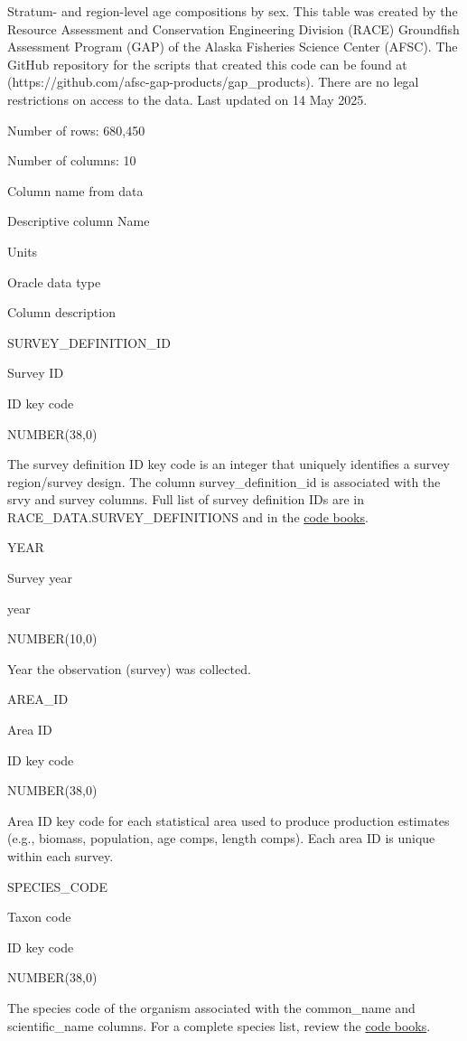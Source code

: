 \documentclass[
  letterpaper,
  oneside,
  open=any]{scrbook}
\begin{document}
Stratum- and region-level age compositions by sex. This table was
created by the Resource Assessment and Conservation Engineering Division
(RACE) Groundfish Assessment Program (GAP) of the Alaska Fisheries
Science Center (AFSC). The GitHub repository for the scripts that
created this code can be found at
(https://github.com/afsc-gap-products/gap\_products). There are no legal
restrictions on access to the data. Last updated on 14 May 2025.

Number of rows: 680,450

Number of columns: 10

Column name from data

Descriptive column Name

Units

Oracle data type

Column description

SURVEY\_DEFINITION\_ID

Survey ID

ID key code

NUMBER(38,0)

The survey definition ID key code is an integer that uniquely identifies
a survey region/survey design. The column survey\_definition\_id is
associated with the srvy and survey columns. Full list of survey
definition IDs are in RACE\_DATA.SURVEY\_DEFINITIONS and in the
\href{https://www.fisheries.noaa.gov/resource/document/groundfish-survey-species-code-manual-and-data-codes-manual}{code
books}.

YEAR

Survey year

year

NUMBER(10,0)

Year the observation (survey) was collected.

AREA\_ID

Area ID

ID key code

NUMBER(38,0)

Area ID key code for each statistical area used to produce production
estimates (e.g., biomass, population, age comps, length comps). Each
area ID is unique within each survey.

SPECIES\_CODE

Taxon code

ID key code

NUMBER(38,0)

The species code of the organism associated with the common\_name and
scientific\_name columns. For a complete species list, review the
\href{https://www.fisheries.noaa.gov/resource/document/groundfish-survey-species-code-manual-and-data-codes-manual}{code
books}.
\end{document}
